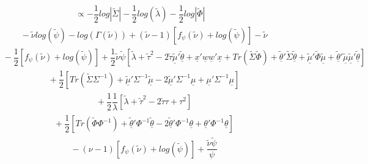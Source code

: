\documentclass[fleqn]{minimal}
\begin{document}
\begin{align*}
  \ \ \ \ \ \
  \propto
  -\dfrac{1}{2}
  log \left| \tilde{\Sigma} \right|
  -\dfrac{1}{2}
  log \left(
    \tilde{\lambda}
  \right)
  - \dfrac{1}{2}
  log \left| \tilde{\Phi} \right|
\end{align*}
\begin{align*}
  \ \ \ \ \ \ \ \ \ \
  -
  \tilde{\nu}
  log \left(
    \tilde{\psi}
  \right)
  -
  log \left(
    \Gamma(\tilde{\nu})
  \right)
  +
  \left( \tilde{\nu}-1 \right)
  \left[
    f_{\psi} \left( \tilde{\nu} \right)
    + log\left( \tilde{\psi} \right)
  \right]
  - 
  \tilde{\nu}
\end{align*}
\begin{align*}
  \ \ \ \ \ \ \ \ \ \
  - \dfrac{1}{2}
  \left[
    f_{\psi} \left( \tilde{\nu} \right)
    + log\left( \tilde{\psi} \right)
  \right]
  + \dfrac{1}{2}
  \tilde{\nu} \tilde{\psi}
  \left[
    \tilde{\lambda} + \tilde{\tau}^2
    - 2\tilde{\tau}\underline{\tilde{\mu}}'\underline{\tilde{\theta}}
    + \underline{x}'\underline{w}\underline{w}'\underline{x}
    + Tr \left( \tilde{\Sigma}\tilde{\Phi}\right)
    + \underline{\tilde{\theta}}'\tilde{\Sigma}\underline{\tilde{\theta}}
    + \underline{\tilde{\mu}}'\tilde{\Phi}\underline{\tilde{\mu}}
    + \underline{\tilde{\theta}}'\underline{\tilde{\mu}}\underline{\tilde{\mu}}'\underline{\tilde{\theta}}
  \right]
\end{align*}
\begin{align*}
  \ \ \ \ \ \ \ \ \ \
  +\dfrac{1}{2}
  \left[
    Tr \left( \tilde{\Sigma}\Sigma^{-1}\right)
    + \underline{\tilde{\mu}}'\Sigma^{-1}\underline{\tilde{\mu}}
    -2 \underline{\tilde{\mu}}'\Sigma^{-1}\underline{\mu}
    + \underline{\mu}'\Sigma^{-1}\underline{\mu}
  \right]
\end{align*}
\begin{align*}
  \ \ \ \ \ \ \ \ \ \
  +\dfrac{1}{2}
  \dfrac{1}{\lambda}
  \left[
    \tilde{\lambda} + \tilde{\tau}^2 - 2\tilde{\tau}\tau + \tau^2
  \right]
\end{align*}
\begin{align*}
  \ \ \ \ \ \ \ \ \ \
  + \dfrac{1}{2}
  \left[
    Tr\left(\tilde{\Phi} \Phi^{-1}\right)
    + \underline{\tilde{\theta}}'\Phi^{-1}\underline{\tilde{\theta}}
    -2 \underline{\tilde{\theta}}' \Phi^{-1}\underline{\theta}
    + \underline{\theta}' \Phi^{-1}\underline{\theta}
  \right]
\end{align*}
\begin{align*}
  \ \ \ \ \ \ \ \ \ \
  -
  \left( \nu-1 \right)
  \left[
    f_{\psi} \left( \tilde{\nu} \right)
    + log\left( \tilde{\psi} \right)
  \right]
  + 
  \dfrac{\tilde{\nu} \tilde{\psi}}{\psi}
\end{align*}
\end{document}
